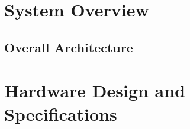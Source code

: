 \documentclass[12pt, letterpaper]{report}
\begin{document}

    \chapter{System Overview}

    \section{Overall Architecture}


    \chapter{Hardware Design and Specifications}
\end{document}
